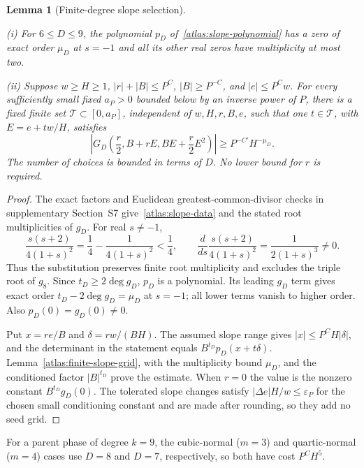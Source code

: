 \documentclass[11pt]{amsart}
\newtheorem{lemma}[theorem]{Lemma}
\theoremstyle{definition}
\theoremstyle{remark}
\numberwithin{equation}{section}
\begin{document}
\begin{lemma}[Finite-degree slope selection]\label{atlas:finite-slopes}\label{low:6:wc36:slope-repair}\label{low:78:s37i:slope-repair}\label{low:78:h3n:slope-repair}\label{low:slope7}\label{low:78:s38det:multiplicity}\label{low:slope8}\label{low:9:h9d:slope}\label{low:slope9}

\leavevmode\noindent\textup{(i)} For $6\le D\le9$, the polynomial $p_D$ of~\eqref{atlas:slope-polynomial} has a zero of exact order $\mu_D$ at $s=-1$ and all its other real zeros have multiplicity at most two.

\noindent\textup{(ii)} Suppose $w\ge H\ge1$, $|r|+|B|\le P^C$, $|B|\ge P^{-C}$, and $|e|\le P^Cw$. For every sufficiently small fixed $a_P>0$ bounded below by an inverse power of $P$, there is a fixed finite set $\mathcal T\subset[0,a_P]$, independent of $w,H,r,B,e$, such that one $t\in\mathcal T$, with $E=e+tw/H$, satisfies
\[
\left|G_D\left(\frac r2,B+rE,BE+\frac r2E^2\right)\right|\ge P^{-C'}H^{-\mu_D}.
\]
The number of choices is bounded in terms of $D$. No lower bound for $r$ is required.
\end{lemma}
\begin{proof}
The exact factors and Euclidean greatest-common-divisor checks in supplementary Section~S7 give~\eqref{atlas:slope-data} and the stated root multiplicities of $g_D$. For real $s\ne-1$,
\[
\frac{s(s+2)}{4(1+s)^2}=\frac14-\frac1{4(1+s)^2}<\frac14,\qquad
\frac{d}{ds}\frac{s(s+2)}{4(1+s)^2}=\frac1{2(1+s)^3}\ne0.
\]
Thus the substitution preserves finite root multiplicity and excludes the triple root of $g_8$. Since $t_D\ge2\deg g_D$, $p_D$ is a polynomial. Its leading $g_D$ term gives exact order $t_D-2\deg g_D=\mu_D$ at $s=-1$; all lower terms vanish to higher order. Also $p_D(0)=g_D(0)\ne0$.

Put $x=re/B$ and $\delta=rw/(BH)$. The assumed slope range gives $|x|\le P^CH|\delta|$, and the determinant in the statement equals $B^{t_D}p_D(x+t\delta)$. Lemma~\ref{atlas:finite-slope-grid}, with the multiplicity bound $\mu_D$, and the conditioned factor $|B|^{t_D}$ prove the estimate. When $r=0$ the value is the nonzero constant $B^{t_D}g_D(0)$. The tolerated slope changes satisfy $|\Delta e|H/w\le\varepsilon_P$ for the chosen small conditioning constant and are made after rounding, so they add no seed grid.
\end{proof}

For a parent phase of degree $k=9$, the cubic-normal ($m=3$) and quartic-normal ($m=4$) cases use $D=8$ and $D=7$, respectively, so both have cost $P^CH^5$.
\end{document}
